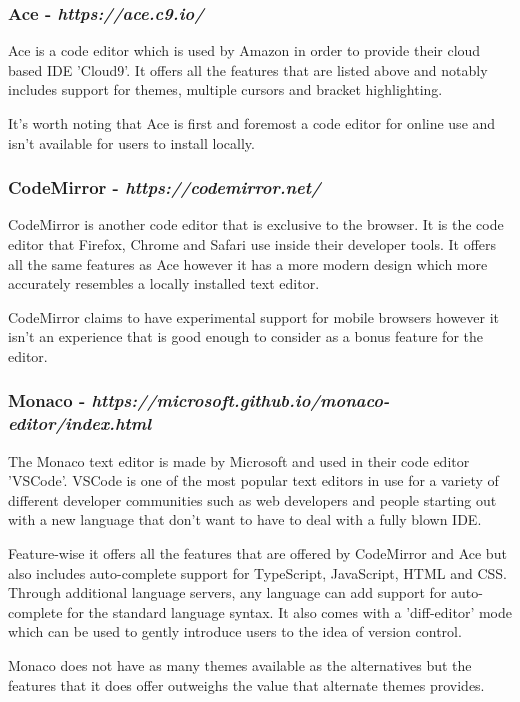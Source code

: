 \subsubsection{Ace - \textit{https://ace.c9.io/}}

Ace is a code editor which is used by Amazon in order to provide their cloud based IDE 'Cloud9'. It offers all the features that are listed above and notably includes support for themes, multiple cursors and bracket highlighting.

It's worth noting that Ace is first and foremost a code editor for online use and isn't available for users to install locally.

\subsubsection{CodeMirror - \textit{https://codemirror.net/}}

CodeMirror is another code editor that is exclusive to the browser. It is the code editor that Firefox, Chrome and Safari use inside their developer tools. It offers all the same features as Ace however it has a more modern design which more accurately resembles a locally installed text editor.

CodeMirror claims to have experimental support for mobile browsers however it isn't an experience that is good enough to consider as a bonus feature for the editor.

\subsubsection{Monaco - \textit{https://microsoft.github.io/monaco-editor/index.html}}

The Monaco text editor is made by Microsoft and used in their code editor 'VSCode'. VSCode is one of the most popular text editors in use for a variety of different developer communities such as web developers and people starting out with a new language that don't want to have to deal with a fully blown IDE.

Feature-wise it offers all the features that are offered by CodeMirror and Ace but also includes auto-complete support for TypeScript, JavaScript, HTML and CSS. Through additional language servers, any language can add support for auto-complete for the standard language syntax. It also comes with a 'diff-editor' mode which can be used to gently introduce users to the idea of version control.

Monaco does not have as many themes available as the alternatives but the features that it does offer outweighs the value that alternate themes provides.

